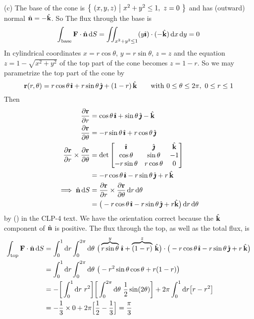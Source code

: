 \begin{solution}
(c)
The base of the cone is $\big\{ \ (x,y,z)\ \big|\ x^2+y^2\le1,\ z=0\ \big\}$
and has (outward) normal $\hat{\mathbf{n}}=-\hat{\mathbf{k}}$. So
The flux through the base is
\begin{equation*}
\int_{{\rm base}}\mathbf{F}\cdot\hat{\mathbf{n}}\, \mathrm{d}S
=\iint_{x^2+y^2\le 1}(y\hat{\pmb{\imath}})\cdot(-\hat{\mathbf{k}})\,\mathrm{d}x\,\mathrm{d}y=0
\end{equation*}
In cylindrical coordinates
$x=r\cos\theta$,
$y=r\sin\theta$,
$z=z$
and the equation $z=1-\sqrt{x^2+y^2}$ of the top part of the cone
becomes $z=1-r$. So we may parametrize the top part of the cone by 
\begin{equation*}
\mathbf{r}(r,\theta)=r\cos\theta\,\hat{\pmb{\imath}}+r\sin\theta\,\hat{\pmb{\jmath}}
+(1-r)\,\hat{\mathbf{k}}
\qquad\text{with } 0\le\theta\le 2\pi,\ 0\le r\le 1
\end{equation*}
Then
\begin{align*}
\pdiff{\vr}{r}&=\cos\theta\,\hi+\sin\theta\,\hj-\hk\\
\pdiff{\vr}{\theta}&=-r\sin\theta\,\hi+r\cos\theta\,\hj\\
\pdiff{\vr}{r}\times\pdiff{\vr}{\theta}
&=\det\left[\begin{matrix}
                    \hi   & \hj   & \hk \\
               \cos\theta & \sin\theta & -1 \\
               -r\sin\theta & r\cos\theta & 0 \end{matrix}\right] \\
&= -r\cos\theta\,\hi-r\sin\theta\,\hj+r\,\hk \\
\implies \hn\,\dee{S}&=\pdiff{\vr}{r}\times\pdiff{\vr}{\theta}
                      \, \dee{r}\,\dee{\theta} \\
&=\big(-r\cos\theta\,\hi-r\sin\theta\,\hj+r\hk\big)\, \dee{r}\,\dee{\theta}
\end{align*}
by () in the CLP-4 text.
We have the orientation correct because the $\hat{\mathbf{k}}$ component of $\hat{\mathbf{n}}$ is
positive. The flux through the top, as well as the total flux, is
\begin{align*}
\int_{{\rm top}}\vF\cdot\hn\, \dee{S}
&=\int_0^1 \dee{r}\int_0^{2\pi}\dee{\theta}\ 
                   \big(\overbrace{r\sin\theta}^{y}\,\hi
                   +\overbrace{(1-r)}^{z}\,\hk\big)
\cdot\big(-r\cos\theta\,\hi-r\sin\theta\,\hj+r\,\hk\big)\\
&=\int_0^1 \dee{r}\int_0^{2\pi}\dee{\theta}\ \big(-r^2\sin\theta\cos\theta+r(1-r)\big)
\\
&= -\bigg[\int_0^1 \dee{r}\ r^2\bigg]
         \bigg[\int_0^{2\pi}\dee{\theta}\ \frac{1}{2}\sin(2\theta)\bigg]
   +2\pi \int_0^1 \dee{r}\big[r-r^2\big] \\
&=-\frac{1}{3}\times 0+2\pi\Big[\frac{1}{2}-\frac{1}{3}\Big]
=\frac{\pi}{3}
\end{align*}
\end{solution}







